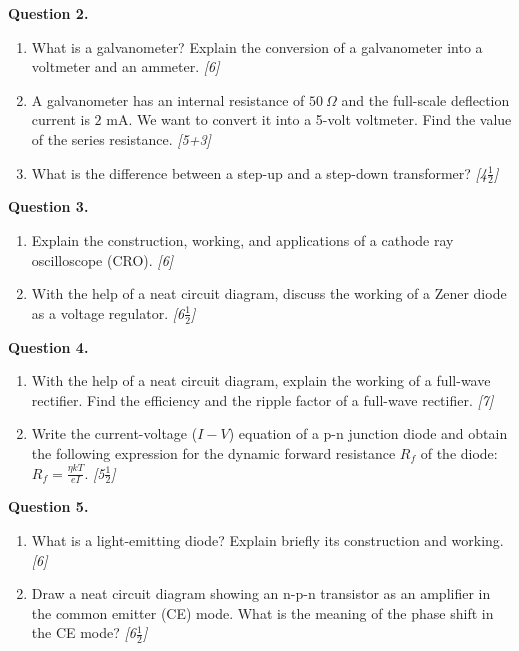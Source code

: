 \documentclass[11pt,a4paper]{article}
\newcommand{\pts}[1]{\hfill \textit{[#1]}}
\begin{document}
\bigskip

\noindent \textbf{Question 2.}
\begin{enumerate}[label=(\alph*)]
  \item What is a galvanometer? Explain the conversion of a galvanometer into a voltmeter and an ammeter. \pts{6}
  \item A galvanometer has an internal resistance of $50\ \Omega$ and the full-scale deflection current is $2\text{ mA}$. We want to convert it into a 5-volt voltmeter. Find the value of the series resistance. \pts{5+3}
  \item What is the difference between a step-up and a step-down transformer? \pts{4$\frac{1}{2}$}
\end{enumerate}

\bigskip

\noindent \textbf{Question 3.}
\begin{enumerate}[label=(\alph*)]
  \item Explain the construction, working, and applications of a cathode ray oscilloscope (CRO). \pts{6}
  \item With the help of a neat circuit diagram, discuss the working of a Zener diode as a voltage regulator. \pts{6$\frac{1}{2}$}
\end{enumerate}

\bigskip

\noindent \textbf{Question 4.}
\begin{enumerate}[label=(\alph*)]
  \item With the help of a neat circuit diagram, explain the working of a full-wave rectifier. Find the efficiency and the ripple factor of a full-wave rectifier. \pts{7}
  \item Write the current-voltage ($I-V$) equation of a p-n junction diode and obtain the following expression for the dynamic forward resistance $R_f$ of the diode: $R_f = \frac{\eta k T}{e I}$. \pts{5$\frac{1}{2}$}
\end{enumerate}

\bigskip

\noindent \textbf{Question 5.}
\begin{enumerate}[label=(\alph*)]
  \item What is a light-emitting diode? Explain briefly its construction and working. \pts{6}
  \item Draw a neat circuit diagram showing an n-p-n transistor as an amplifier in the common emitter (CE) mode. What is the meaning of the phase shift in the CE mode? \pts{6$\frac{1}{2}$}
\end{enumerate}
\end{document}

